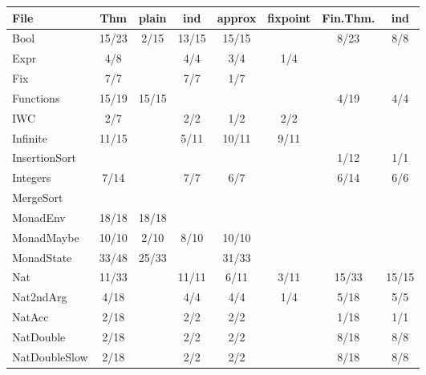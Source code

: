 %
%
%
%
\begin{tabular}{>{\footnotesize}l || >{\footnotesize}c | >{\footnotesize}c | >{\footnotesize}c | >{\footnotesize}c | >{\footnotesize}c || >{\footnotesize}c | >{\footnotesize}c}
File                       & Thm & plain & ind & approx & fixpoint & Fin.Thm. & ind \\
\hline
Bool                       & 15/23 & 2/15 & 13/15 & 15/15 &  & 8/23 & 8/8\\
Expr                       & 4/8 &  & 4/4 & 3/4 & 1/4 &  & \\
Fix                        & 7/7 &  & 7/7 & 1/7 &  &  & \\
Functions                  & 15/19 & 15/15 &  &  &  & 4/19 & 4/4\\
IWC                        & 2/7 &  & 2/2 & 1/2 & 2/2 &  & \\
Infinite                   & 11/15 &  & 5/11 & 10/11 & 9/11 &  & \\
InsertionSort              &  &  &  &  &  & 1/12 & 1/1\\
Integers                   & 7/14 &  & 7/7 & 6/7 &  & 6/14 & 6/6\\
MergeSort                  &  &  &  &  &  &  & \\
MonadEnv                   & 18/18 & 18/18 &  &  &  &  & \\
MonadMaybe                 & 10/10 & 2/10 & 8/10 & 10/10 &  &  & \\
MonadState                 & 33/48 & 25/33 &  & 31/33 &  &  & \\
Nat                        & 11/33 &  & 11/11 & 6/11 & 3/11 & 15/33 & 15/15\\
Nat2ndArg                  & 4/18 &  & 4/4 & 4/4 & 1/4 & 5/18 & 5/5\\
NatAcc                     & 2/18 &  & 2/2 & 2/2 &  & 1/18 & 1/1\\
NatDouble                  & 2/18 &  & 2/2 & 2/2 &  & 8/18 & 8/8\\
NatDoubleSlow              & 2/18 &  & 2/2 & 2/2 &  & 8/18 & 8/8\\

\end{tabular}
